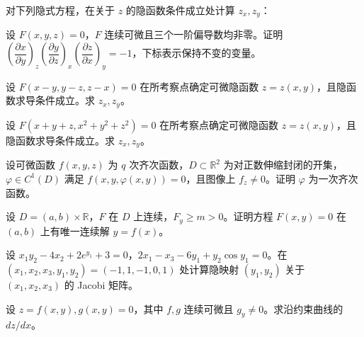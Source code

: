 \newpage
\noindent\begin{minipage}{\textwidth}
对下列隐式方程，在关于 $z$ 的隐函数条件成立处计算 $z_x,z_y$：
\end{minipage}\par\vfill
\noindent\begin{minipage}{\textwidth}
设 $F(x,y,z)=0$，$F$ 连续可微且三个一阶偏导数均非零。证明 $\left(\dfrac{\partial x}{\partial y}\right)_z\left(\dfrac{\partial y}{\partial z}\right)_x\left(\dfrac{\partial z}{\partial x}\right)_y=-1$，下标表示保持不变的变量。
\end{minipage}\par\vfill
\noindent\begin{minipage}{\textwidth}
设 $F(x-y,y-z,z-x)=0$ 在所考察点确定可微隐函数 $z=z(x,y)$，且隐函数求导条件成立。求 $z_x,z_y$。
\end{minipage}\par\vfill
\newpage
\noindent\begin{minipage}{\textwidth}
设 $F(x+y+z,x^2+y^2+z^2)=0$ 在所考察点确定可微隐函数 $z=z(x,y)$，且隐函数求导条件成立。求 $z_x,z_y$。
\end{minipage}\par\vfill
\noindent\begin{minipage}{\textwidth}
设可微函数 $f(x,y,z)$ 为 $q$ 次齐次函数，$D\subset\mathbb R^2$ 为对正数伸缩封闭的开集，$\varphi\in C^1(D)$ 满足 $f(x,y,\varphi(x,y))=0$，且图像上 $f_z\ne0$。证明 $\varphi$ 为一次齐次函数。
\end{minipage}\par\vfill
\noindent\begin{minipage}{\textwidth}
设 $D=(a,b)\times\mathbb R$，$F$ 在 $D$ 上连续，$F_y\ge m>0$。证明方程 $F(x,y)=0$ 在 $(a,b)$ 上有唯一连续解 $y=f(x)$。
\end{minipage}\par\vfill
\newpage
\noindent\begin{minipage}{\textwidth}
设 $x_1y_2-4x_2+2e^{y_1}+3=0$，$2x_1-x_3-6y_1+y_2\cos y_1=0$。在 $(x_1,x_2,x_3,y_1,y_2)=(-1,1,-1,0,1)$ 处计算隐映射 $(y_1,y_2)$ 关于 $(x_1,x_2,x_3)$ 的 Jacobi 矩阵。
\end{minipage}\par\vfill
\noindent\begin{minipage}{\textwidth}
设 $z=f(x,y),g(x,y)=0$，其中 $f,g$ 连续可微且 $g_y\ne0$。求沿约束曲线的 $dz/dx$。
\end{minipage}\par\vfill
